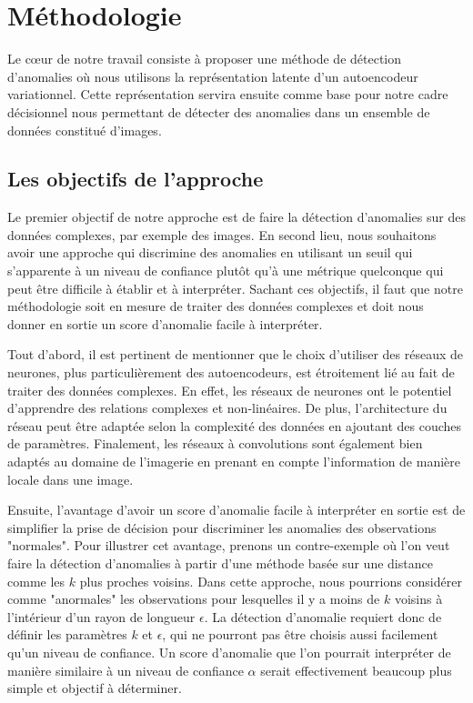 \chapter{Méthodologie}     %
\label{chap:methodologie}                   %

Le cœur de notre travail consiste à proposer une méthode de détection d'anomalies où nous utilisons la représentation latente d'un autoencodeur variationnel. Cette représentation servira ensuite comme base pour notre cadre décisionnel nous permettant de détecter des anomalies dans un ensemble de données constitué d'images.

\section{Les objectifs de l'approche} \label{objectifs_metho}

Le premier objectif de notre approche est de faire la détection d'anomalies sur des données complexes, par exemple des images. En second lieu, nous souhaitons avoir une approche qui discrimine des anomalies en utilisant un seuil qui s'apparente à un niveau de confiance plutôt qu'à une métrique quelconque qui peut être difficile à établir et à interpréter. Sachant ces objectifs, il faut que notre méthodologie soit en mesure de traiter des données complexes et doit nous donner en sortie un score d'anomalie facile à interpréter.

Tout d'abord, il est pertinent de mentionner que le choix  d'utiliser des réseaux de neurones, plus particulièrement des autoencodeurs, est étroitement lié au fait de traiter des données complexes. En effet, les réseaux de neurones ont le potentiel d'apprendre des relations complexes et non-linéaires. De plus, l'architecture du réseau peut être adaptée selon la complexité des données en ajoutant des couches de paramètres. Finalement, les réseaux à convolutions sont également bien adaptés au domaine de l'imagerie en prenant en compte l'information de manière locale dans une image.

Ensuite, l'avantage d'avoir un score d'anomalie facile à interpréter en sortie est de simplifier la prise de décision pour discriminer les anomalies des observations "normales". Pour illustrer cet avantage, prenons un contre-exemple où l'on veut faire la détection d'anomalies à partir d'une méthode basée sur une distance comme les $k$ plus proches voisins. Dans cette approche, nous pourrions considérer comme "anormales" les observations pour lesquelles il y a moins de $k$ voisins à l'intérieur d'un rayon de longueur $\epsilon$. La détection d'anomalie requiert donc de définir les paramètres $k$ et $\epsilon$, qui ne pourront pas être choisis aussi facilement qu'un niveau de confiance. Un score d'anomalie que l'on pourrait interpréter de manière similaire à un niveau de confiance $\alpha$ serait effectivement beaucoup plus simple et objectif à déterminer.

